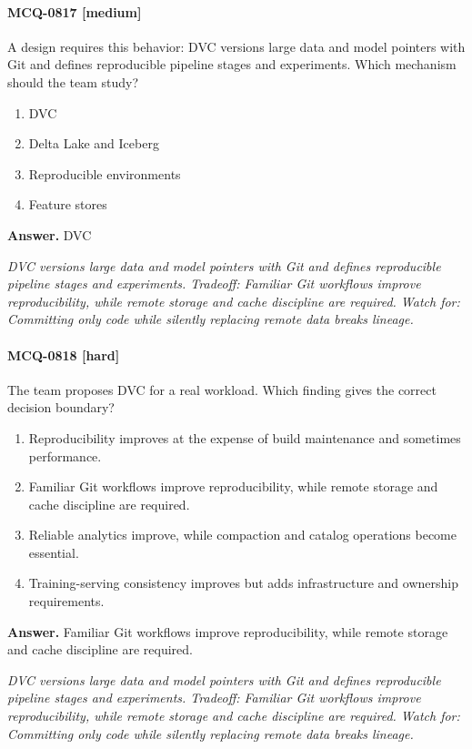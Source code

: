 \paragraph{MCQ-0817 [medium]} A design requires this behavior: DVC versions large data and model pointers with Git and defines reproducible pipeline stages and experiments. Which mechanism should the team study?
\begin{enumerate}[label=\Alph*.]
\item DVC
\item Delta Lake and Iceberg
\item Reproducible environments
\item Feature stores
\end{enumerate}
\noindent\textbf{Answer.} DVC
\par\textit{DVC versions large data and model pointers with Git and defines reproducible pipeline stages and experiments. Tradeoff: Familiar Git workflows improve reproducibility, while remote storage and cache discipline are required. Watch for: Committing only code while silently replacing remote data breaks lineage.}
\paragraph{MCQ-0818 [hard]} The team proposes DVC for a real workload. Which finding gives the correct decision boundary?
\begin{enumerate}[label=\Alph*.]
\item Reproducibility improves at the expense of build maintenance and sometimes performance.
\item Familiar Git workflows improve reproducibility, while remote storage and cache discipline are required.
\item Reliable analytics improve, while compaction and catalog operations become essential.
\item Training-serving consistency improves but adds infrastructure and ownership requirements.
\end{enumerate}
\noindent\textbf{Answer.} Familiar Git workflows improve reproducibility, while remote storage and cache discipline are required.
\par\textit{DVC versions large data and model pointers with Git and defines reproducible pipeline stages and experiments. Tradeoff: Familiar Git workflows improve reproducibility, while remote storage and cache discipline are required. Watch for: Committing only code while silently replacing remote data breaks lineage.}
